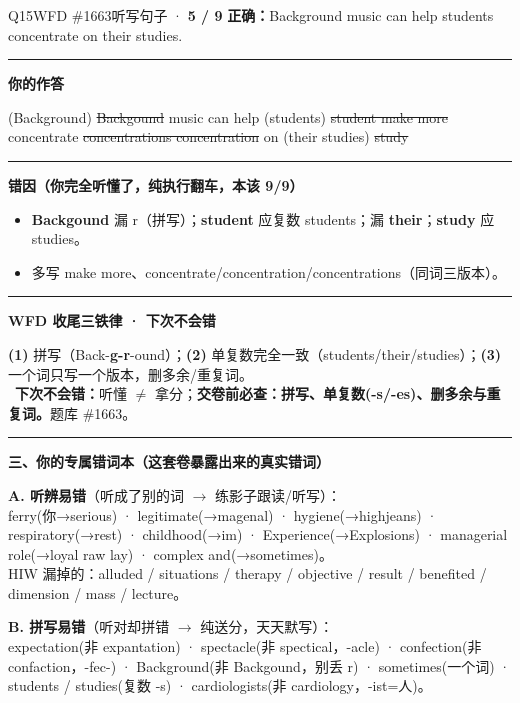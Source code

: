 \documentclass[11pt]{article}
\newcommand{\yes}{{\color{cFix}\ding{51}}}
\newcommand{\ptesub}[1]{%
  \par\needspace{2\baselineskip}\smallskip
  {\color{cAccent}\rule[-0.2ex]{3pt}{1.05em}}\hspace{6pt}%
  {\bfseries\color{cHead}#1}\par\nopagebreak\smallskip}
\newcommand{\zh}[1]{{\footnotesize\textcolor{cNote}{\textbf{译}}\ \textcolor{gray}{#1}}}
\newcommand{\lhit}[1]{{\color{cFix}#1}}
\newcommand{\lmiss}[1]{{\color{cWrong}\sout{#1}}}
\begin{document}
\begin{qblock}{Q15\quad WFD \#1663}{听写句子 · \textcolor{cPartial}{\bfseries 5 / 9}}
\textbf{正确：}Background music can help students concentrate on their studies.\quad\zh{背景音乐能帮助学生集中精力学习。}
\ptesub{你的作答}
{\small {\color{gray}(Background)} \lmiss{Backgound} \lhit{music can help} {\color{gray}(students)} \lmiss{student make more} \lhit{concentrate} \lmiss{concentrations concentration} \lhit{on} {\color{gray}(their studies)} \lmiss{study}}
\ptesub{错因（你完全听懂了，纯执行翻车，本该 9/9）}
\begin{itemize}[leftmargin=1.4em,itemsep=1pt,topsep=2pt]
\item \textbf{Backgound} 漏 r（拼写）；\textbf{student} 应复数 students；漏 \textbf{their}；\textbf{study} 应 studies。
\item 多写 make more、concentrate/concentration/concentrations（同词三版本）。
\end{itemize}
\ptesub{WFD 收尾三铁律 · 下次不会错}
\begin{notebox}\small
\textbf{(1)} 拼写（Back-\textbf{g-r}-ound）；\textbf{(2)} 单复数完全一致（students/their/studies）；\textbf{(3)} 一个词只写一个版本，删多余/重复词。\\
\yes\ \textbf{下次不会错：}听懂 $\ne$ 拿分；\textbf{交卷前必查：拼写、单复数(-s/-es)、删多余与重复词。}\quad 题库 \#1663。
\end{notebox}
\end{qblock}

\ptesub{三、你的专属错词本（这套卷暴露出来的真实错词）}

\begin{notebox}\small
\textbf{A. 听辨易错}（听成了别的词 $\to$ 练影子跟读/听写）：\\
ferry(你→serious) · legitimate(→magenal) · hygiene(→highjeans) · respiratory(→rest) · childhood(→im) ·
Experience(→Explosions) · managerial role(→loyal raw lay) · complex and(→sometimes)。\\
HIW 漏掉的：alluded / situations / therapy / objective / result / benefited / dimension / mass / lecture。
\end{notebox}

\begin{notebox}\small
\textbf{B. 拼写易错}（听对却拼错 $\to$ 纯送分，天天默写）：\\
expectation(非 expantation) · spectacle(非 spectical，-acle) · confection(非 confaction，-fec-) ·
Background(非 Backgound，别丢 r) · sometimes(一个词) · students / studies(复数 -s) · cardiologists(非 cardiology，-ist=人)。
\end{notebox}
\end{document}
